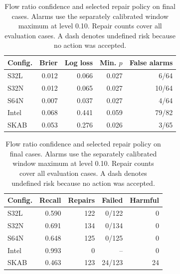 \documentclass{llncs}
\newcommand{\1}{\mathbf{1}}
\begin{document}
\begin{table}[!tbp]
\centering
\caption{Flow ratio confidence and selected repair policy on final cases. Alarms use the separately calibrated window maximum at level 0.10. Repair counts cover all evaluation cases. A dash denotes undefined risk because no action was accepted.}
\label{tab:confidence}
\small
\begin{tabular}{lrrrr}\toprule
Config. & Brier & Log loss & Min. $p$ & False alarms \\\midrule
S32L & 0.012 & 0.066 & 0.027 & 6/64 \\
S32N & 0.012 & 0.065 & 0.027 & 10/64 \\
S64N & 0.007 & 0.037 & 0.027 & 4/64 \\
Intel & 0.068 & 0.441 & 0.059 & 79/82 \\
SKAB & 0.053 & 0.276 & 0.026 & 3/65 \\
\bottomrule
\end{tabular}
\par\medskip
\begin{tabular}{lrrrr}\toprule
Config. & Recall & Repairs & Failed & Harmful \\\midrule
S32L & 0.590 & 122 & 0/122 & 0 \\
S32N & 0.691 & 134 & 0/134 & 0 \\
S64N & 0.648 & 125 & 0/125 & 0 \\
Intel & 0.993 & 0 & -- & 0 \\
SKAB & 0.463 & 123 & 24/123 & 24 \\
\bottomrule
\end{tabular}
\end{table}
\end{document}
